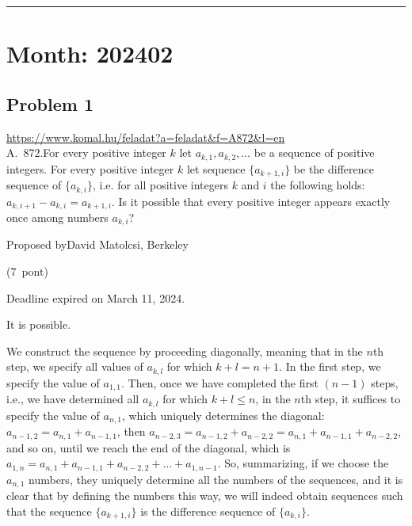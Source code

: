 \documentclass{article}
\begin{document}
\vspace{1em}
\hrule
\vspace{1em}

\section*{Month: 202402}

\subsection*{Problem 1}
\noindent\url{https://www.komal.hu/feladat?a=feladat&f=A872&l=en}\\[1em]

A. 872.For every positive integer \(\displaystyle k\) let \(\displaystyle a_{k,1},a_{k,2},\ldots\) be a sequence of positive integers. For every positive integer \(\displaystyle k\) let sequence \(\displaystyle \{a_{k+1, i}\}\) be the difference sequence of \(\displaystyle \{a_{k, i}\}\), i.e. for all positive integers \(\displaystyle k\) and \(\displaystyle i\) the following holds: \(\displaystyle a_{k, i+1}-a_{k, i}=a_{k+1, i}\). Is it possible that every positive integer appears exactly once among numbers \(\displaystyle a_{k,i}\)?

Proposed byDavid Matolcsi, Berkeley

(7 pont)

Deadline expired on March 11, 2024.

It is possible.

We construct the sequence by proceeding diagonally, meaning that in the \(\displaystyle n\)th step, we specify all values of \(\displaystyle a_{k,l}\) for which \(\displaystyle k+l=n+1\). In the first step, we specify the value of \(\displaystyle a_{1,1}\). Then, once we have completed the first \(\displaystyle (n-1)\) steps, i.e., we have determined all \(\displaystyle a_{k,l}\) for which \(\displaystyle k+l \leq n\), in the \(\displaystyle n\)th step, it suffices to specify the value of \(\displaystyle a_{n,1}\), which uniquely determines the diagonal: \(\displaystyle a_{n-1, 2}=a_{n,1}+a_{n-1,1}\), then \(\displaystyle a_{n-2,3}=a_{n-1,2}+a_{n-2,2}=a_{n,1}+a_{n-1,1}+a_{n-2,2}\), and so on, until we reach the end of the diagonal, which is \(\displaystyle a_{1,n}=a_{n,1}+a_{n-1,1}+a_{n-2,2}+\ldots +a_{1,n-1}\). So, summarizing, if we choose the \(\displaystyle a_{n,1}\) numbers, they uniquely determine all the numbers of the sequences, and it is clear that by defining the numbers this way, we will indeed obtain sequences such that the sequence \(\displaystyle \{a_{k+1,i}\}\) is the difference sequence of \(\displaystyle \{a_{k,i}\}\).
\end{document}
